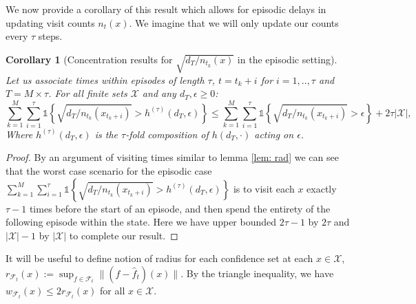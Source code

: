 \documentclass{article}
\newtheorem{corollary}{Corollary}
\newcommand{\Ind}{\mathds{1}}
\newcommand{\Xc}{\mathcal{X}}
\newcommand{\Fc}{\mathcal{F}}
\begin{document}
We now provide a corollary of this result which allows for episodic delays in updating visit counts $n_t(x)$.
We imagine that we will only update our counts every $\tau$ steps.

\begin{corollary}[Concentration results for $\sqrt{d_T / n_{t_k}(x)}$ in the episodic setting]
\label{cor: rad ep} \hspace{0.000000001mm} \newline
Let us associate times within episodes of length $\tau$, $t = t_k+i$ for $i=1,..,\tau$ and $T = M \times \tau$.
For all finite sets $\Xc$ and any $d_T, \epsilon \ge 0$:
$$\sum_{k=1}^M \sum_{i=1}^\tau \Ind \left\{ \sqrt{ d_T / n_{t_k}(x_{t_k+i}) } > h^{(\tau)}(d_T,\epsilon) \right\} \le 
	\sum_{k=1}^M \sum_{i=1}^\tau  \Ind \left\{ \sqrt{ d_T / n_{t_k}(x_{t_k+i}) } > \epsilon \right\} + 2\tau |\Xc|,$$
Where $h^{(\tau)}(d_T,\epsilon)$ is the $\tau$-fold composition of $h(d_T,\cdot)$ acting on $\epsilon$.
\end{corollary}
\begin{proof}
By an argument of visiting times similar to lemma \ref{lem: rad} we can see that the worst case scenario for the episodic case $\sum_{k=1}^M \sum_{i=1}^\tau \Ind \left\{ \sqrt{ d_T / n_{t_k}(x_{t_k+i}) } > h^{(\tau)}(d_T,\epsilon) \right\}$ is to visit each $x$ exactly $\tau-1$ times before the start of an episode, and then spend the entirety of the following episode within the state.
Here we have upper bounded $2\tau-1$ by $2\tau$ and $|\Xc|-1$ by $|\Xc|$ to complete our result.
\end{proof}

It will be useful to define notion of radius for each confidence set at each $x \in \Xc$, 
$r_{\Fc_t}(x) := \sup_{f \in \Fc_t} \| (f - \hat{f}_t)(x) \|.$
By the triangle inequality, we have $w_{\Fc_t}(x) \le 2 r_{\Fc_t}(x)$ for all $x \in \Xc$.
\end{document}
